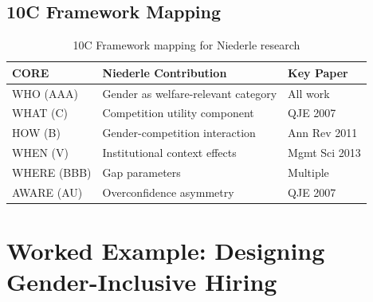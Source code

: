\subsection{10C Framework Mapping}

\begin{table}[h]
\centering
\begin{tabular}{lll}
\hline
\textbf{CORE} & \textbf{Niederle Contribution} & \textbf{Key Paper} \\
\hline
WHO (AAA) & Gender as welfare-relevant category & All work \\
WHAT (C) & Competition utility component & QJE 2007 \\
HOW (B) & Gender-competition interaction & Ann Rev 2011 \\
WHEN (V) & Institutional context effects & Mgmt Sci 2013 \\
WHERE (BBB) & Gap parameters & Multiple \\
AWARE (AU) & Overconfidence asymmetry & QJE 2007 \\
\hline
\end{tabular}
\caption{10C Framework mapping for Niederle research}
\end{table}

\section{Worked Example: Designing Gender-Inclusive Hiring}

